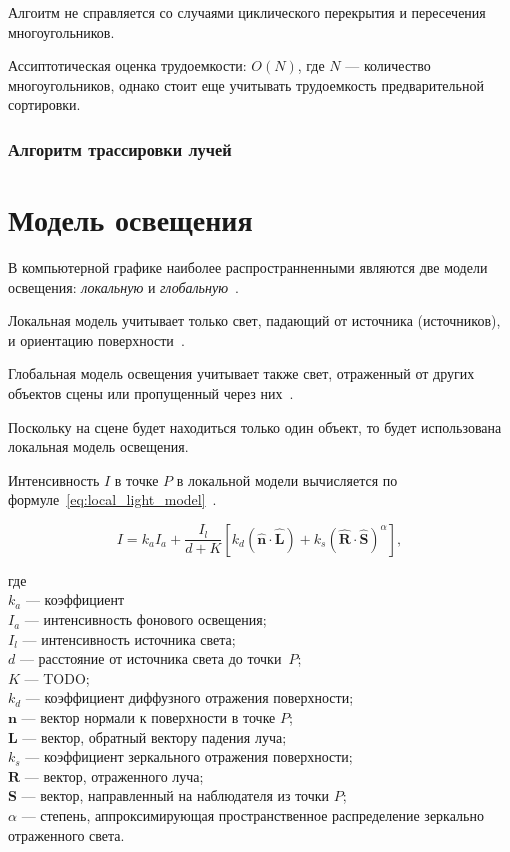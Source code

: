    Алгоитм не справляется со случаями циклического перекрытия и пересечения многоугольников.
   
   Ассиптотическая оценка трудоемкости: $O(N)$, где $N$ --- количество многоугольников, однако стоит еще учитывать трудоемкость предварительной сортировки.
     
    \subsubsection{Алгоритм трассировки лучей}
    
    
    \section{Модель освещения}
    
    В компьютерной графике наиболее распространненными являются две модели освещения: \textit{локальную} и \textit{глобальную}~\cite{rogers}.
    
    Локальная модель учитывает только свет, падающий от источника (источников), и ориентацию поверхности~\cite{rogers}.
    
    Глобальная модель освещения учитывает также свет, отраженный от других объектов сцены или пропущенный через них~\cite{rogers}.
    
    Поскольку на сцене будет находиться только один объект, то будет использована локальная модель освещения.
    
    Интенсивность $I$ в точке $P$ в локальной модели вычисляется по формуле~\ref{eq:local_light_model}~\cite{rogers}.
    
    \begin{equation}
    	\label{eq:local_light_model}
    	I = k_aI_a + \frac{I_l}{d + K}[k_d(\mathbf{\hat{n}\cdot \hat{L}})+k_s(\mathbf{\hat{R}\cdot \hat{S}})^\alpha],
    \end{equation}
    
    где \\
    $k_a$ --- коэффициент \\
    $I_a$ --- интенсивность фонового освещения; \\
    $I_l$ --- интенсивность источника света; \\
    $d$ --- расстояние от источника света до точки~$P$; \\
    $K$ --- TODO; \\
    $k_d$ --- коэффициент диффузного отражения поверхности; \\
    $\mathbf{n}$ --- вектор нормали к поверхности в точке $P$; \\
    $\mathbf{L}$ --- вектор, обратный вектору падения луча; \\
    $k_s$ --- коэффициент зеркального отражения поверхности; \\
    $\mathbf{R}$ --- вектор, отраженного луча; \\
    $\mathbf{S}$ --- вектор, направленный на наблюдателя из точки $P$; \\
    $\alpha$ --- степень, аппроксимирующая пространственное распределение зеркально отраженного света.
        

